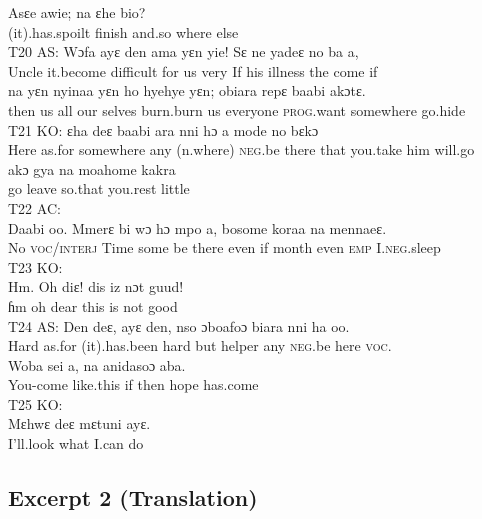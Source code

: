\documentclass[output=paper,colorlinks,citecolor=brown]{langscibook}
\begin{document}
    \ex
    \gll    Asɛe awie; na ɛhe bio?\\
            (it).has.spoilt finish and.so where else \\
    \z
\ex T20 AS:\label{ex:obeng:49}
    \ea
    \gll    Wɔfa ayɛ den ama yɛn yie! Sɛ ne yadeɛ no ba a, \\
            Uncle it.become difficult for us very If his illness the come if \\
    \ex
    \gll    na yɛn nyinaa yɛn ho  hyehye yɛn; obiara repɛ baabi akɔtɛ.\\
            then us all our selves burn.burn us everyone \textsc{prog}.want somewhere go.hide\\
    \z
\ex\label{ex:obeng:50}
    T21 KO:
    \ea
    \gll    ɛha deɛ baabi ara nni hɔ a mode no bɛkɔ \\
            Here as.for somewhere any (n.where) \textsc{neg}.be there that you.take him will.go \\
    \ex
    \gll    akɔ gya na moahome kakra\\
            go leave so.that you.rest little \\
    \z
\ex\label{ex:obeng:51}
    T22 AC:\\
    \gll    Daabi oo. Mmerɛ bi wɔ hɔ mpo a, bosome koraa na mennaeɛ.\\
            No \textsc{voc/interj} Time some be there even if month even \textsc{emp} I.\textsc{neg}.sleep \\
\ex\label{ex:obeng:52}
    T23 KO:\\
    \gll    Hm. Oh diɛ! dis iz nɔt guud!\\
            ɦm oh dear this is not good\\
\ex\label{ex:obeng:53}
    T24 AS:
    \ea
    \gll    Den deɛ, ayɛ den, nso ɔboafoɔ biara nni ha oo.\\
            Hard as.for (it).has.been hard but helper any \textsc{neg}.be here \textsc{voc}.\\
    \ex
    \gll    Woba sei a, na anidasoɔ aba. \\
            You-come like.this if then hope has.come\\
    \z
\ex\label{ex:obeng:54}
    T25 KO:\\
    \gll    Mɛhwɛ deɛ mɛtuni ayɛ.\\
 	        I’ll.look what I.can do\\
\z

\subsection{Excerpt 2 (Translation)}
\end{document}
